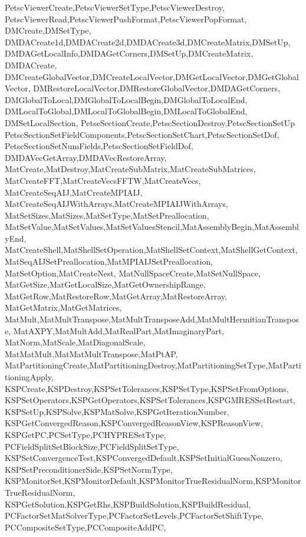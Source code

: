 {{{{{    PetscViewerCreate,PetscViewerSetType,PetscViewerDestroy,
    PetscViewerRead,PetscViewerPushFormat,PetscViewerPopFormat,
    DMCreate,DMSetType,
    DMDACreate1d,DMDACreate2d,DMDACreate3d,DMCreateMatrix,DMSetUp,
    DMDAGetLocalInfo,DMDAGetCorners,DMSetUp,DMCreateMatrix,
    DMDACreate, %
    DMCreateGlobalVector,DMCreateLocalVector,DMGetLocalVector,DMGetGlobalVector,
    DMRestoreLocalVector,DMRestoreGlobalVector,DMDAGetCorners,
    DMGlobalToLocal,DMGlobalToLocalBegin,DMGlobalToLocalEnd,
    DMLocalToGlobal,DMLocalToGlobalBegin,DMLocalToGlobalEnd,
    DMSetLocalSection,
    PetscSectionCreate,PetscSectionDestroy,PetscSectionSetUp
    PetscSectionSetFieldComponents,PetscSectionSetChart,PetscSectionSetDof,
    PetscSectionSetNumFields,PetscSectionSetFieldDof,
    DMDAVecGetArray,DMDAVecRestoreArray,
    MatCreate,MatDestroy,MatCreateSubMatrix,MatCreateSubMatrices,
    MatCreateFFT,MatCreateVecsFFTW,MatCreateVecs,
    MatCreateSeqAIJ,MatCreateMPIAIJ,
    MatCreateSeqAIJWithArrays,MatCreateMPIAIJWithArrays,
    MatSetSizes,MatSizes,MatSetType,MatSetPreallocation,
    MatSetValue,MatSetValues,MatSetValuesStencil,MatAssemblyBegin,MatAssemblyEnd,
    MatCreateShell,MatShellSetOperation,MatShellSetContext,MatShellGetContext,
    MatSeqAIJSetPreallocation,MatMPIAIJSetPreallocation,    
    MatSetOption,MatCreateNest,
    MatNullSpaceCreate,MatSetNullSpace,
    MatGetSize,MatGetLocalSize,MatGetOwnershipRange,
    MatGetRow,MatRestoreRow,MatGetArray,MatRestoreArray,
    MatGetMatrix,MatGetMatrices,
    MatMult,MatMultTranspose,MatMultTransposeAdd,MatMultHermitianTranspose,
    MatAXPY,MatMultAdd,MatRealPart,MatImaginaryPart,
    MatNorm,MatScale,MatDiagonalScale,
    MatMatMult,MatMatMultTranspose,MatPtAP,
    MatPartitioningCreate,MatPartitioningDestroy,MatPartitioningSetType,MatPartitioningApply,
    KSPCreate,KSPDestroy,KSPSetTolerances,KSPSetType,KSPSetFromOptions,
    KSPSetOperators,KSPGetOperators,KSPSetTolerances,KSPGMRESSetRestart,
    KSPSetUp,KSPSolve,KSPMatSolve,KSPGetIterationNumber,
    KSPGetConvergedReason,KSPConvergedReasonView,KSPReasonView,
    KSPGetPC,PCSetType,PCHYPRESetType,
    PCFieldSplitSetBlockSize,PCFieldSplitSetType,
    KSPSetConvergenceTest,KSPConvergedDefault,KSPSetInitialGuessNonzero,
    KSPSetPreconditionerSide,KSPSetNormType,
    KSPMonitorSet,KSPMonitorDefault,KSPMonitorTrueResidualNorm,KSPMonitorTrueResidualNorm,
    KSPGetSolution,KSPGetRhs,KSPBuildSolution,KSPBuildResidual,
    PCFactorSetMatSolverType,PCFactorSetLevels,PCFactorSetShiftType,
    PCCompositeSetType,PCCompositeAddPC,
}}}}}
